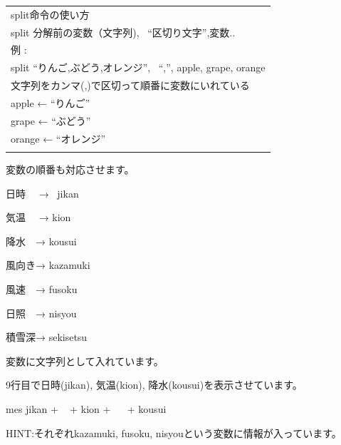 \documentclass[text08.tex]{subfiles}
\begin{document}
\begin{table}[htbp]
    \centering
    \begin{tabular}{|l|}
        \hline
        
        split命令の使い方\\

        split 分解前の変数（文字列), \ “区切り文字”,変数..\\
        例 : \\
        split “りんご,ぶどう,オレンジ”, \ “,”, apple, grape, orange\\
        文字列をカンマ(,)で区切って順番に変数にいれている\\

        apple ← “りんご”\\

        grape ← “ぶどう”\\

        orange ← “オレンジ”\\
        \\\hline
    \end{tabular}
\end{table}



\bigskip


\bigskip

変数の順番も対応させます。

日時 　→ \ jikan

気温　 → kion 　

降水　→ kousui

風向き→ kazamuki

風速　→ fusoku

日照　→ nisyou

積雪深→ sekisetsu

変数に文字列として入れています。


\bigskip

9行目で日時(jikan), 気温(kion),
降水(kousui)を表示させています。

mes jikan + {\textquotedbl} \ {\textquotedbl} + kion + {\textquotedbl} \ \ {\textquotedbl} + kousui


\clearpage
\begin{tcolorbox}[title=\useOmetoi,breakable]\label{Q:amedas1}
  \begin{enumerate}
    HINT:それぞれkazamuki, fusoku, nisyouという変数に情報が入っています。
  \end{enumerate}
\end{tcolorbox}
\end{document}
